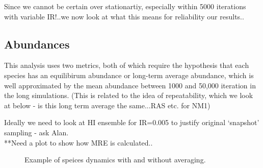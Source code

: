 Since we cannot be certain over stationartiy, especially within 5000 iterations with variable IR!..we now look at what this means for reliability our results..

\subsection{Abundances}

This analysis uses two metrics, both of which require the hypothesis that each species has an equilibirum abundance or long-term average abundance, which is well approximated by the mean abundance between 1000 and 50,000 iteration in the long simulations. (This is related to the idea of repeatability, which we look at below - is this long term average the same...RAS etc. for NM1)

Ideally we need to look at HI ensemble for IR=0.005 to justify original `snapshot' sampling - ask Alan.\\
**Need a plot to show how MRE is calculated..
\begin{figure}[hp]
	\centering
		
    \caption{Example of speices dynamics with and without averaging.}    
    \label{fig:maf_example}
\end{figure}

